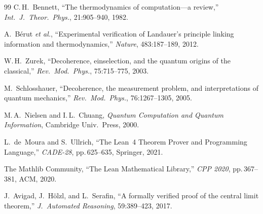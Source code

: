 \documentclass[11pt, a4paper]{article}
\begin{document}
\begin{thebibliography}{99}
 C.\,H.~Bennett, ``The thermodynamics of computation---a review,'' \textit{Int.\ J.\ Theor.\ Phys.}, 21:905--940, 1982.

 A.~B\'{e}rut \textit{et al.}, ``Experimental verification of Landauer's principle linking information and thermodynamics,'' \textit{Nature}, 483:187--189, 2012.

 W.\,H.~Zurek, ``Decoherence, einselection, and the quantum origins of the classical,'' \textit{Rev.\ Mod.\ Phys.}, 75:715--775, 2003.

 M.~Schlosshauer, ``Decoherence, the measurement problem, and interpretations of quantum mechanics,'' \textit{Rev.\ Mod.\ Phys.}, 76:1267--1305, 2005.

 M.\,A.~Nielsen and I.\,L.~Chuang, \textit{Quantum Computation and Quantum Information}, Cambridge Univ.\ Press, 2000.

 L.~de~Moura and S.~Ullrich, ``The Lean~4 Theorem Prover and Programming Language,'' \textit{CADE-28}, pp.\,625--635, Springer, 2021.

 The Mathlib Community, ``The Lean Mathematical Library,'' \textit{CPP 2020}, pp.\,367--381, ACM, 2020.

 J.~Avigad, J.~H\"{o}lzl, and L.~Serafin, ``A formally verified proof of the central limit theorem,'' \textit{J.\ Automated Reasoning}, 59:389--423, 2017.

\end{thebibliography}
\endgroup
\end{document}
